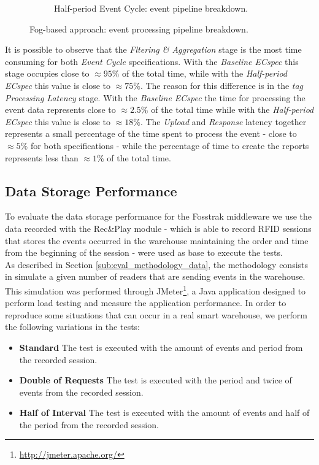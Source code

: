 \begin{figure}[ht!]
\begin{subfigure}{.5\textwidth}
    \caption{Half-period Event Cycle: event pipeline breakdown.}
    \label{fig:ecspec_effective_half}
  \end{subfigure}
  \caption[Fog-based approach: event processing breakdown.]{Fog-based approach: event processing pipeline breakdown.}
  \label{fig:ecspec_effective_breakdown}
\end{figure}

It is possible to observe that the \textit{Fltering \& Aggregation} stage is the most time consuming
for both \textit{Event Cycle} specifications. With the \textit{Baseline ECspec} this stage occupies
close to $\approx95\%$ of the total time, while with the \textit{Half-period ECspec} this value is
close to $\approx75\%$. The reason for this difference is in the \textit{tag Processing Latency} stage.
With the \textit{Baseline ECspec} the time for processing the event data represents close to $\approx2.5\%$
of the total time while with the \textit{Half-period ECspec} this value is close to $\approx18\%$.
The \textit{Upload} and \textit{Response} latency together represents a small percentage of
the time spent to process the event - close to $\approx5\%$ for both specifications - while the percentage
of time to create the reports represents less than $\approx1\%$ of the total time.\\

\subsection{Data Storage Performance}
\label{sub:eval_exp_data}
To evaluate the data storage performance for the Fosstrak middleware we use the data recorded with the Rec\&Play
module - which is able to record \gls{RFID} sessions that stores the events occurred in the warehouse
maintaining the order and time from the beginning of the session - were used as base to execute
the tests.\\

As described in Section \ref{sub:eval_methodology_data}, the methodology consists in simulate a given
number of readers that are sending events in the warehouse. This simulation was performed through JMeter\footnote{\url{http://jmeter.apache.org/}},
a Java application designed to perform load testing and measure the application performance.
In order to reproduce some situations that can occur in a real smart warehouse, we perform the following
variations in the tests:

\begin{itemize}
  \item\textbf{Standard} The test is executed with the amount of events and period from the recorded session.
  \item\textbf{Double of Requests} The test is executed with the period and twice of events from the recorded
  session.
  \item\textbf{Half of Interval} The test is executed with the amount of events and half of the period from
  the recorded session.
\end{itemize}

